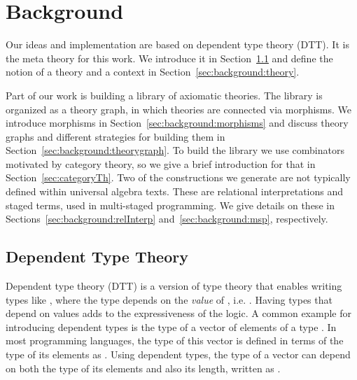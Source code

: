 \chapter{Background}
\label{ch:background}
Our ideas and implementation are based on dependent type theory (DTT). It is the meta theory for this work. We introduce it in Section~\ref{subsec:background:dtt} and define the notion of a theory and a context in Section~\ref{sec:background:theory}.

Part of our work is building a library of axiomatic theories. The library is organized as a theory graph, in which theories are connected via morphisms. We introduce morphisms in Section~\ref{sec:background:morphisms} and discuss theory graphs and different strategies for building them in Section~\ref{sec:background:theorygraph}. 
To build the library we use combinators motivated by category theory, so we give a brief introduction for that in Section~\ref{sec:categoryTh}. 
Two of the constructions we generate are not typically defined within universal algebra texts. These are relational interpretations and staged terms, used in multi-staged programming. We give details on these in Sections~\ref{sec:background:relInterp} and~\ref{sec:background:msp}, respectively. 

\section{Dependent Type Theory}
\label{subsec:background:dtt}
Dependent type theory (DTT) is a version of type theory that enables writing types like 
, %
where the type  depends on the \emph{value} of , i.e. . 
Having types that depend on values adds to the expressiveness of the logic. A common example for introducing dependent types is the type of a vector of  elements of a type . 
In most programming languages, the type of this vector is defined in terms of the type of its elements as . Using dependent types, the type of a vector can depend on both the type of its elements and also its length, written as .
 
